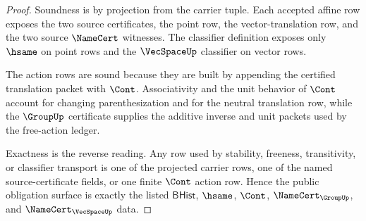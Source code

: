\begin{proof}
Soundness is by projection from the carrier tuple. Each accepted affine row exposes the two source certificates, the point row, the vector-translation row, and the two source $\NameCert$ witnesses. The classifier definition exposes only $\hsame$ on point rows and the $\VecSpaceUp$ classifier on vector rows.

The action rows are sound because they are built by appending the certified translation packet with $\Cont$. Associativity and the unit behavior of $\Cont$ account for changing parenthesization and for the neutral translation row, while the $\GroupUp$ certificate supplies the additive inverse and unit packets used by the free-action ledger.

Exactness is the reverse reading. Any row used by stability, freeness, transitivity, or classifier transport is one of the projected carrier rows, one of the named source-certificate fields, or one finite $\Cont$ action row. Hence the public obligation surface is exactly the listed $\mathsf{BHist}$, $\hsame$, $\Cont$, $\NameCert_{\GroupUp}$, and $\NameCert_{\VecSpaceUp}$ data.
\end{proof}

